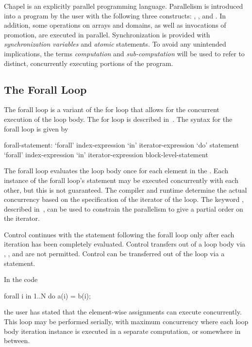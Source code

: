 \label{Parallelism_and_Synchronization}

Chapel is an explicitly parallel programming language.  Parallelism is
introduced into a program by the user with the following three
constructs: , , and .  In
addition, some operations on arrays and domains, as well as
invocations of promotion, are executed in parallel.  Synchronization
is provided with \emph{synchronization variables} and \emph{atomic}
statements.  To avoid any unintended implications, the
terms \emph{computation} and \emph{sub-computation} will be used to
refer to distinct, concurrently executing portions of the program.

\subsection{The Forall Loop}
\label{Forall}

The forall loop is a variant of the for loop that allows for the
concurrent execution of the loop body. The for loop is described
in~. The syntax for the forall loop is given by
\begin{syntax}
forall-statement:
   `forall' index-expression `in' iterator-expression `do' statement
   `forall' index-expression `in' iterator-expression block-level-statement
\end{syntax}

The forall loop evaluates the loop body once for each element in
the .  Each instance of the forall loop's
statement may be executed concurrently with each other, but this is
not guaranteed.  The compiler and runtime determine the actual
concurrency based on the specification of the iterator of the loop.
The keyword , described in~, can be
used to constrain the parallelism to give a partial order on the
iterator.

Control continues with the statement following the forall loop only
after each iteration has been completely evaluated.  Control transfers
out of a loop body via , ,
and  are not permitted.  Control can be transferred out
of the loop via a  statement.

\begin{example}
In the code
\begin{chapel}
forall i in 1..N do
  a(i) = b(i);
\end{chapel}
the user has stated that the element-wise assignments can execute
concurrently.  This loop may be performed serially, with maximum
concurrency where each loop body iteration instance is executed in a
separate computation, or somewhere in between.
\end{example}

